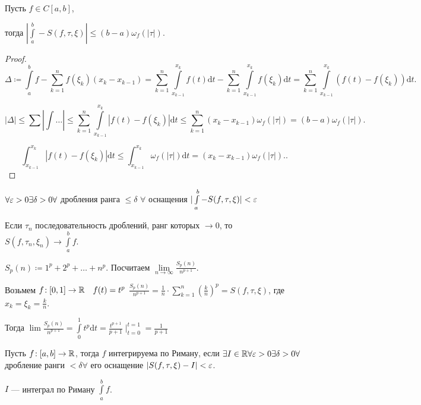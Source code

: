 \begin{theorem}
    Пусть $f \in C[a, b]$,

    тогда  $|\int\limits_a^b - S(f, \tau, \xi)| \le (b-a)\omega_f(|\tau|)$.
\end{theorem}
\begin{proof}
    \[\Delta \coloneqq \int\limits_a^b f - \sum\limits_{k=1}^n f(\xi_k)(x_k - x_{k-1}) = \sum\limits_{k=1}^n \int\limits_{x_{k-1}}^{x_k} f(t)\mathrm{d}t - \sum\limits_{k=1}^n \int\limits_{x_{k-1}}^{x_k}f(\xi_k) \mathrm{d}t = \sum\limits_{k=1}^n \int\limits_{x_{k-1}}^{x_k}(f(t) - f(\xi_k))\mathrm{d}t.\] 

    \[|\Delta| \le \sum |\int \ldots| \le \sum\limits_{k=1}^n \int\limits_{x_{k-1}}^{x_k} |f(t) - f(\xi_k)| \mathrm{d}t \le \sum_{k=1}^n (x_k - x_{k-1})\omega_f(|\tau|) = (b-a)\omega_f(|\tau|).\]

    \[
        \int_{x_{k-1}}^{x_k} |f(t) - f(\xi_k)| \mathrm{d}t \le \int_{x_{k-1}}^{x_k} \omega_f(|\tau|) \mathrm{d}t = (x_k - x_{k-1}) \omega_f(|\tau|).
    .\] 
\end{proof}
\begin{consequence}
    $\forall \varepsilon > 0 \exists \delta > 0 \forall$ дробления ранга  $\le \delta$ $\forall$ оснащения  $|\int\limits_a^b - S(f, \tau, \xi)| < \varepsilon$
\end{consequence}
\begin{consequence}
    Если $\tau_n$ последовательность дроблений, ранг которых  $\to 0$, то $S(f, \tau_n, \xi_n) \to \int\limits_a^b f$.  
\end{consequence}
\begin{example}
    $S_p(n) \coloneqq 1^p + 2^p + \ldots + n^p$. Посчитаем $\lim\limits_{n \to \infty} \frac{S_p(n)}{n^{p+1}}$.

    Возьмем $f\!: [0,1] \to \mathbb{R}\quad f(t) = t^p$
    $\frac{S_p(n)}{n^{p+1}} = \frac{1}{n} \cdot \sum\limits_{k=1}^n \left(\frac{k}{n}\right)^p = S(f, \tau, \xi)$, где $x_k = \xi_k = \frac{k}{n}$.

    Тогда $\lim \frac{S_p(n)}{n^{p+1}} = \int\limits_0^1 t^p \mathrm{d}t = \frac{t^{p+1}}{p+1} \mid_{t=0}^{t=1} = \frac{1}{p+1}$
\end{example}

\begin{definition}
    Пусть $f\!: [a, b] \to \mathbb{R}$, тогда $f$  интегрируема по Риману, если $\exists I \in \mathbb{R} \forall \varepsilon > 0 \exists \delta > 0 \forall$ дробление ранги  $< \delta \forall$ его оснащение  $|S(f, \tau, \xi) - I| < \varepsilon$. 

     $I$ --- интеграл по Риману  $\int\limits_a^b f$.
\end{definition}
